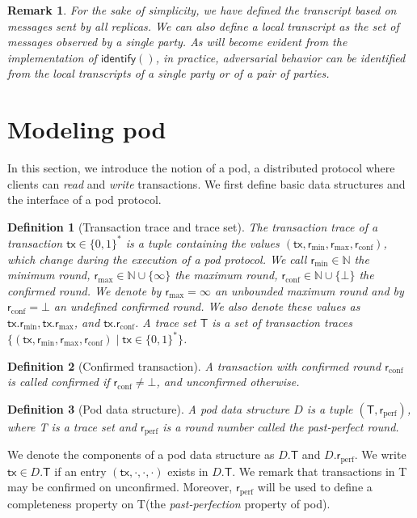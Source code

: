 \documentclass[pdflatex,sn-mathphys-num]{sn-jnl}%
\theoremstyle{thmstyleone}%
\theoremstyle{thmstyletwo}%
\newtheorem{remark}{Remark}%
\theoremstyle{thmstylethree}%
\newtheorem{definition}{Definition}%
\newcommand{\podtm}{\textsf{pod}\xspace}
\newcommand{\BN}{\ensuremath{\mathbb{N}}\xspace}
\newcommand{\operand}[1]{\textsf{#1}}
\newcommand{\tx}{\operand{tx}\xspace}
\newcommand{\round}{\operand{r}\xspace}
\newcommand{\rconf}{\ensuremath{\round_\text{conf}}\xspace}
\newcommand{\rmin}{\ensuremath{\round_\text{min}}\xspace}
\newcommand{\rmax}{\ensuremath{\round_\text{max}}\xspace}
\newcommand{\rperf}{\ensuremath{\round_\text{perf}}\xspace}
\newcommand{\identify}[1]{\ensuremath{\mathsf{identify}(#1)}\xspace}
\newcommand{\txSet}{\operand{T}\xspace}
\newcommand{\Pod}{\ensuremath{D}\xspace}
\newcommand{\confirmed}{confirmed\xspace}
\newcommand{\zo}{\ensuremath{\{ 0, 1\}\xspace}}
\begin{document}
\begin{remark}
    For the sake of simplicity, we have defined the transcript based on messages sent by \emph{all} replicas.
    We can also define a \emph{local transcript} as the set of messages observed by a single party.
    As will become evident from the implementation of \identify{}, in practice, adversarial behavior can be identified from the local transcripts of a single party or  of a pair of parties.
\end{remark}

\section{Modeling \podtm} \label{sec:pod-model}
In this section, we introduce the notion of a \podtm, a distributed protocol where clients can \emph{read} and \emph{write} transactions.
We first define basic data structures and the interface of a \podtm protocol.

\begin{definition}[Transaction trace and trace set]
    The \emph{transaction trace} of a transaction $\tx \in \zo^*$ is a tuple containing the values $(\tx, \rmin, \rmax, \rconf)$, which change during the execution of a \podtm protocol.
    We call $\rmin \in \BN$ the \emph{minimum round}, $\rmax \in \BN \cup \{\infty\}$ the \emph{maximum round},
    $\rconf \in \BN \cup \{\bot\}$ the \emph{\confirmed round}.
    We denote by $\rmax=\infty$ an unbounded maximum round and by $\rconf=\bot$ an undefined \confirmed round.
    We also denote these values as $\tx.\rmin, \tx.\rmax$, and $\tx.\rconf$.
    A \emph{trace set} $\txSet$ is a set of transaction traces $\{(\tx, \rmin, \rmax, \rconf) \mid \tx \in \zo^*\}$.
\end{definition}

\begin{definition}[Confirmed transaction]
    A transaction with confirmed round \rconf is called \emph{\confirmed} if $\rconf \neq \bot$, and \emph{unconfirmed} otherwise.
\end{definition}

\begin{definition}[Pod data structure]
    A \emph{pod data structure} $\Pod$ is a tuple $(\txSet, \rperf)$, where \txSet is a trace set and \rperf is a round number called the \emph{past-perfect round}.
\end{definition}
We denote the components of a pod data structure as $\Pod.\txSet$ and $\Pod.\rperf$.
We write $\tx \in \Pod.\txSet$ if an entry $(\tx, \cdot, \cdot, \cdot)$ exists in $\Pod.\txSet$.
We remark that transactions in \txSet may be \confirmed on unconfirmed. Moreover, \rperf will be used to define a completeness property on \txSet (the \emph{past-perfection} property of \podtm).
\end{document}
